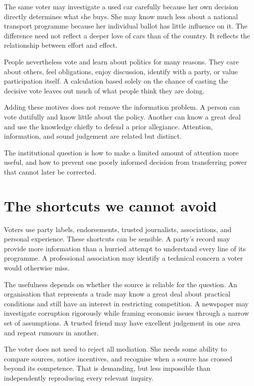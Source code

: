 \documentclass[12pt,a4paper]{book}
\begin{document}
The same voter may investigate a used car carefully because her own decision directly determines what she buys. She may know much less about a national transport programme because her individual ballot has little influence on it. The difference need not reflect a deeper love of cars than of the country. It reflects the relationship between effort and effect.

People nevertheless vote and learn about politics for many reasons. They care about others, feel obligations, enjoy discussion, identify with a party, or value participation itself. A calculation based solely on the chance of casting the decisive vote leaves out much of what people think they are doing.

Adding these motives does not remove the information problem. A person can vote dutifully and know little about the policy. Another can know a great deal and use the knowledge chiefly to defend a prior allegiance. Attention, information, and sound judgement are related but distinct.

The institutional question is how to make a limited amount of attention more useful, and how to prevent one poorly informed decision from transferring power that cannot later be corrected.

\section*{The shortcuts we cannot avoid}

Voters use party labels, endorsements, trusted journalists, associations, and personal experience. These shortcuts can be sensible. A party's record may provide more information than a hurried attempt to understand every line of its programme. A professional association may identify a technical concern a voter would otherwise miss.

The usefulness depends on whether the source is reliable for the question. An organisation that represents a trade may know a great deal about practical conditions and still have an interest in restricting competition. A newspaper may investigate corruption rigorously while framing economic issues through a narrow set of assumptions. A trusted friend may have excellent judgement in one area and repeat rumours in another.

The voter does not need to reject all mediation. She needs some ability to compare sources, notice incentives, and recognise when a source has crossed beyond its competence. That is demanding, but less impossible than independently reproducing every relevant inquiry.
\end{document}
